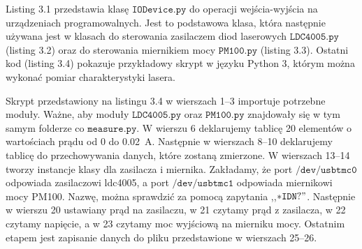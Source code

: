 Listing 3.1 przedstawia klasę $\mathtt{IODevice.py}$ do operacji  wejścia-wyjścia na urządzeniach programowalnych.
Jest to podstawowa klasa, która następnie używana jest w klasach do sterowania zasilaczem
diod laserowych $\mathtt{LDC4005.py}$ (listing 3.2) oraz do sterowania miernikiem mocy $\mathtt{PM100.py}$ (listing 3.3).
Ostatni kod (listing 3.4) pokazuje przykładowy skrypt w języku Python 3, którym można wykonać pomiar charakterystyki lasera.
\newpage



Skrypt przedstawiony na listingu 3.4 w wierszach 1--3 importuje potrzebne moduły. Ważne, aby moduły $\mathtt{LDC4005.py}$ oraz $\mathtt{PM100.py}$
znajdowały się w tym samym folderze co $\mathtt{measure.py}$.
W wierszu 6 deklarujemy tablicę 20 elementów o wartościach prądu od 0 do 0.02 \,A. Następnie w wierszach 8--10 deklarujemy
tablicę do przechowywania danych, które zostaną zmierzone.
W wierszach 13--14 tworzy instancje klasy dla zasilacza i miernika. Zakładamy, że port $\mathtt{/dev/usbtmc0}$ odpowiada zasilaczowi ldc4005,
a port $\mathtt{/dev/usbtmc1}$ odpowiada miernikowi mocy PM100. Nazwę, można sprawdzić za pomocą zapytania  ,,$\mathtt{*IDN?}"$.
Następnie w wierszu 20 ustawiany prąd na zasilaczu, w 21 czytamy prąd z zasilacza, w 22 czytamy napięcie, a w 23 czytamy moc wyjściową na mierniku mocy.
Ostatnim etapem jest zapisanie danych do pliku  przedstawione w wierszach 25--26.

